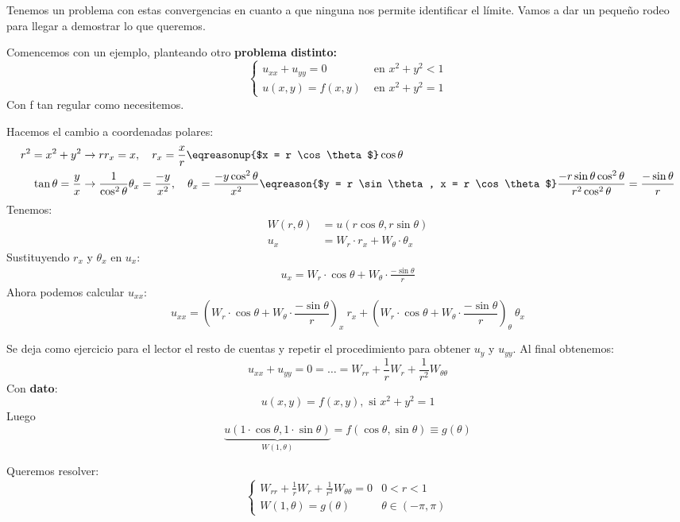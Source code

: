 		Tenemos un problema con estas convergencias en cuanto a que ninguna nos permite identificar el límite. Vamos a dar un pequeño rodeo para llegar a demostrar lo que queremos.

		Comencemos con un ejemplo, planteando otro \textbf{problema distinto:}
		\[
			\begin{cases}
				u_{xx} + u_{yy} = 0 & \text{ en } x^2 + y^2 < 1\\
				u(x,y) = f(x,y) & \text{ en } x^2 + y^2 = 1
			\end{cases}
		\]
		Con f tan regular como necesitemos.

		Hacemos el cambio a coordenadas polares:
		\begin{align*}
		 r^2 = x^2 + y^2  &\rightarrow rr_x = x , \quad r_x = \frac{x}{r} \eqreasonup{$x = r \cos \theta $} \cos \theta \\
		 \tan \theta = \frac{y}{x}  &\rightarrow \frac{1}{\cos^2 \theta} \theta_x = \frac{-y}{x^2}, \quad \theta_x = \frac{-y \cos^2\theta}{x^2} \eqreason{$y = r \sin \theta, x = r \cos \theta$} \frac{-r \sin \theta \cos^2 \theta}{r^2 \cos^2 \theta} = \frac{- \sin \theta}{r}
		\end{align*}
		Tenemos:
		\begin{align*}
			W(r, \theta) &= u(r \cos \theta, r \sin \theta)\\
			u_x &= W_r \cdot r_x + W_\theta \cdot \theta_x
		\end{align*}
		Sustituyendo $r_x$ y $\theta_x$ en $u_x$:
		\begin{align*}
			u_x = W_r \cdot \cos \theta + W_\theta \cdot \frac{- \sin \theta}{r}
		\end{align*}
		Ahora podemos calcular $u_{xx}$:
		$$ u_{xx} = (W_r \cdot \cos \theta + W_\theta \cdot \frac{- \sin \theta}{r})_x \ r_x + (W_r \cdot \cos \theta + W_\theta \cdot \frac{- \sin \theta}{r})_\theta \ \theta_x$$

		Se deja como ejercicio para el lector el resto de cuentas y repetir el procedimiento para obtener $u_y$ y $u_{yy}$. Al final obtenemos:
		$$ u_{xx} + u_{yy} = 0 = \dots = W_{rr} + \frac{1}{r}W_r + \frac{1}{r^2}W_{\theta\theta}$$
		Con \textbf{dato}:
		\[ u(x,y) = f(x,y), \text{ si } x^2 + y^2 = 1\]
		Luego
		\[ \underbrace{u(1 \cdot \cos \theta,1 \cdot \sin \theta)}_{W(1,\theta)} = f(\cos \theta, \sin \theta) \equiv g(\theta)\]

		Queremos resolver:
		\[
			\begin{cases}
			W_{rr} + \frac{1}{r} W_r + \frac{1}{r^2} W_{\theta \theta} = 0 & 0 < r < 1 \\
			W(1, \theta) = g(\theta) & \theta \in (-\pi,\pi)
			\end{cases}
		\]

